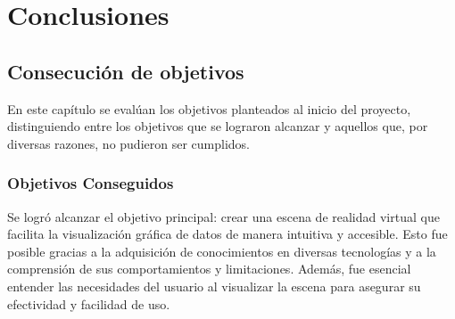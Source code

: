 \documentclass[a4paper, 12pt]{book}
\begin{document}
\cleardoublepage







\chapter{Conclusiones}
\label{chap:conclusiones}


\section{Consecución de objetivos}
\label{sec:consecucion-objetivos}

En este capítulo se evalúan los objetivos planteados al inicio del proyecto, distinguiendo entre los objetivos que se lograron alcanzar y aquellos que, por diversas razones, no pudieron ser cumplidos.

\subsection{Objetivos Conseguidos}



Se logró alcanzar el objetivo principal: crear una escena de realidad virtual que facilita la visualización gráfica de datos de manera intuitiva y accesible. Esto fue posible gracias a la adquisición de conocimientos en diversas tecnologías y a la comprensión de sus comportamientos y limitaciones. Además, fue esencial entender las necesidades del usuario al visualizar la escena para asegurar su efectividad y facilidad de uso.
\end{document}
